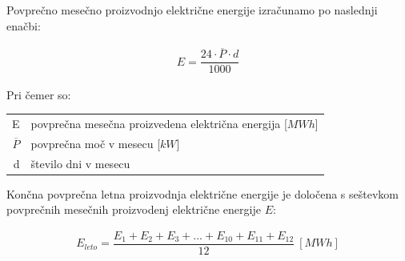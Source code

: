 Povprečno mesečno proizvodnjo električne energije izračunamo po naslednji enačbi:

\begin{ceqn}
\begin{align}
E = \dfrac{24 \cdot \overline{P} \cdot d}{1000}
\end{align}
\end{ceqn}

Pri čemer so:
\begin{table}[htb!]
\begin{tabular}{r|p{10cm}}
	E & povprečna mesečna proizvedena električna energija [$MWh$]\\
	$\overline{P}$ & povprečna moč v mesecu [$kW$]\\
	d & število dni v mesecu \\
\end{tabular}
\end{table}


Končna povprečna letna proizvodnja električne energije je določena s seštevkom povprečnih mesečnih proizvodenj električne energije $E$:

\begin{ceqn}
\begin{align}
 E_{leto} =  \dfrac{E_1 + E_2 + E_3 + ... + E_{10} + E_{11} + E_{12}}{12} ~[MWh]
\end{align}
\end{ceqn}

